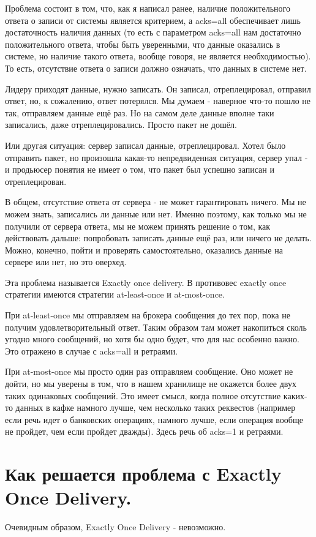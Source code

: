 \documentclass[11pt]{article}
\begin{document}
    Проблема состоит в том, что, как я написал ранее, наличие положительного ответа о записи от системы является критерием, а acks=all обеспечивает лишь достаточность наличия данных (то есть с параметром acks=all нам достаточно положительного ответа, чтобы быть уверенными, что данные оказались в системе, но наличие такого ответа, вообще говоря, не является необходимостью). То есть, отсутствие ответа о записи должно означать, что данных в системе нет.

    Лидеру приходят данные, нужно записать. Он записал, отреплецировал, отправил ответ, но, к сожалению, ответ потерялся. Мы думаем - наверное что-то пошло не так, отправляем данные ещё раз. Но на самом деле данные вполне таки записались, даже отреплецировались. Просто пакет не дошёл.

    Или другая ситуация: сервер записал данные, отреплецировал. Хотел было отправить пакет, но произошла какая-то непредвиденная ситуация, сервер упал - и продьюсер понятия не имеет о том, что пакет был успешно записан и отреплецирован.

    В общем, отсутствие ответа от сервера - не может гарантировать ничего. Мы не можем знать, записались ли данные или нет. Именно поэтому, как только мы не получили от сервера ответа, мы не можем принять решение о том, как действовать дальше: попробовать записать данные ещё раз, или ничего не делать. Можно, конечно, пойти и проверять самостоятельно, оказались данные на сервере или нет, но это оверхед.

    Эта проблема называется Exactly once delivery. В противовес exactly once стратегии имеются стратегии at-least-once и at-most-once.

    При at-least-once мы отправляем на брокера сообщения до тех пор, пока не получим удовлетворительный ответ. Таким образом там может накопиться сколь угодно много сообщений, но хотя бы одно будет, что для нас особенно важно. Это отражено в случае с acks=all и ретраями.

    При at-most-once мы просто один раз отправляем сообщение. Оно может не дойти, но мы уверены в том, что в нашем хранилище не окажется более двух таких одинаковых сообщений. Это имеет смысл, когда полное отсутствие каких-то данных в кафке намного лучше, чем несколько таких реквестов (например если речь идет о банковских операциях, намного лучше, если операция вообще не пройдет, чем если пройдет дважды). Здесь речь об acks=1 и ретраями.

    \section{Как решается проблема с Exactly Once Delivery.}
    Очевидным образом, Exactly Once Delivery - невозможно.
\end{document}
